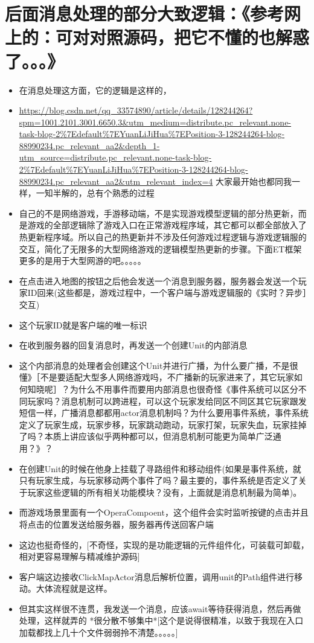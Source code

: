 \documentclass[9pt, b5paper]{article}
\begin{document}
\section{后面消息处理的部分大致逻辑：《参考网上的：可对对照源码，把它不懂的也解惑了。。。》}
\label{sec-6}
\begin{itemize}
\item 在消息处理这方面，它的逻辑是这样的，
\item \url{https://blog.csdn.net/qq_33574890/article/details/128244264?spm=1001.2101.3001.6650.3&utm_medium=distribute.pc_relevant.none-task-blog-2\%7Edefault\%7EYuanLiJiHua\%7EPosition-3-128244264-blog-88990234.pc_relevant_aa2&depth_1-utm_source=distribute.pc_relevant.none-task-blog-2\%7Edefault\%7EYuanLiJiHua\%7EPosition-3-128244264-blog-88990234.pc_relevant_aa2&utm_relevant_index=4} 大家最开始也都同我一样，一知半解的，总有个熟悉的过程
\item\relax [与自己项目的本区别：] 自己的不是网络游戏，手游移动端，不是实现游戏模型逻辑的部分热更新，而是游戏的全部逻辑除了游戏入口在正常游戏程序域，其它都可以都全部放入了热更新程序域。所以自己的热更新并不涉及任何游戏过程逻辑与游戏逻辑服的交互，简化了无限多的大型网络游戏的逻辑模型热更新的步骤。下面ET框架更多的是用于大型网游的吧。。。。。
\item 在点击进入地图的按钮之后他会发送一个消息到服务器，服务器会发送一个玩家ID回来(这些都是，游戏过程中，一个客户端与游戏逻辑服的《实时？异步］交互)
\item 这个玩家ID就是客户端的唯一标识
\item 在收到服务器的回复消息时，再发送一个创建Unit的内部消息
\item 这个内部消息的处理者会创建这个Unit并进行广播，为什么要广播，不是很懂》［不是要适配大型多人网络游戏吗，不广播新的玩家进来了，其它玩家如何知晓呢］？为什么不用事件而要用内部消息也很奇怪《事件系统可以区分不同玩家吗？消息机制可以跨进程，可以这个玩家发给同区不同区其它玩家跟发短信一样，广播消息都都用actor消息机制吗？为什么要用事件系统，事件系统定义了玩家生成，玩家步移，玩家跳动跑动，玩家打架，玩家失血，玩家挂掉了吗？本质上讲应该似乎两种都可以，但消息机制可能更为简单广泛通用？》？
\item 在创建Unit的时候在他身上挂载了寻路组件和移动组件(如果是事件系统，就只有玩家生成，与玩家移动两个事件了吗？最主要的，事件系统是否定义了关于玩家这些逻辑的所有相关功能模块？没有，上面就是消息机制最为简单)。
\item 而游戏场景里面有一个OperaCompoent，这个组件会实时监听按键的点击并且将点击的位置发送给服务器，服务器再传送回客户端
\item 这边也挺奇怪的，[不奇怪，实现的是功能逻辑的元件组件化，可装载可卸载，相对更容易理解与精减维护源码]
\item 客户端这边接收ClickMapActor消息后解析位置，调用unit的Path组件进行移动。大体流程就是这样。
\item 但其实这样很不连贯，我发送一个消息，应该await等待获得消息，然后再做处理，这样就弄的 *很分散不够集中*[这个是说得很精准，以致于我现在入口加载都找上几十个文件弱弱拎不清楚。。。。。]
\end{itemize}
\end{document}
